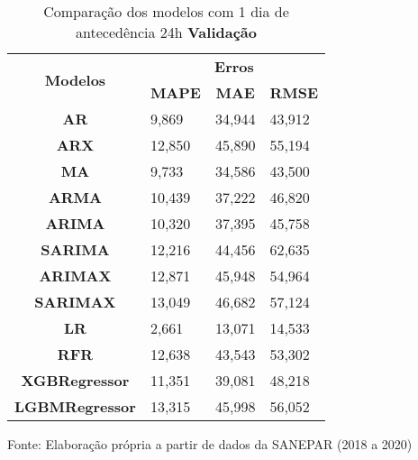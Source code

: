 \begin{table}[H]
	\centering
	\caption{Comparação dos modelos com 1 dia de antecedência 24h \textbf{Validação} }\label{tb:1-24vld}
	\begin{tabular}{@{}clll@{}}
		\toprule
		\multirow{2}{*}{\textbf{Modelos}} & \multicolumn{3}{c}{\textbf{Erros}}                                                                       \\ \cmidrule(l){2-4} 
		& \multicolumn{1}{c}{\textbf{MAPE}} & \multicolumn{1}{c}{\textbf{MAE}} & \multicolumn{1}{c}{\textbf{RMSE}} \\ \hline
\textbf{AR}                       & 9,869                             & 34,944                           & 43,912                            \\
\textbf{ARX}                      & 12,850                            & 45,890                           & 55,194                            \\
\textbf{MA}                       & 9,733                             & 34,586                           & 43,500                            \\
\textbf{ARMA}                     & 10,439                            & 37,222                           & 46,820                            \\
\textbf{ARIMA}                    & 10,320                            & 37,395                           & 45,758                            \\
\textbf{SARIMA}                   & 12,216                            & 44,456                           & 62,635                            \\
\textbf{ARIMAX}                   & 12,871                            & 45,948                           & 54,964                            \\
\textbf{SARIMAX}                  & 13,049                            & 46,682                           & 57,124                            \\
\textbf{LR}        & 2,661                             & 13,071                           & 14,533                            \\
\textbf{RFR}  & 12,638                            & 43,543                           & 53,302                            \\
\textbf{XGBRegressor}             & 11,351                            & 39,081                           & 48,218                            \\
\textbf{LGBMRegressor}            & 13,315                            & 45,998                           & 56,052                            \\ \bottomrule
	\end{tabular}

Fonte: Elaboração própria a partir de dados da SANEPAR (2018 a 2020)
\end{table}

